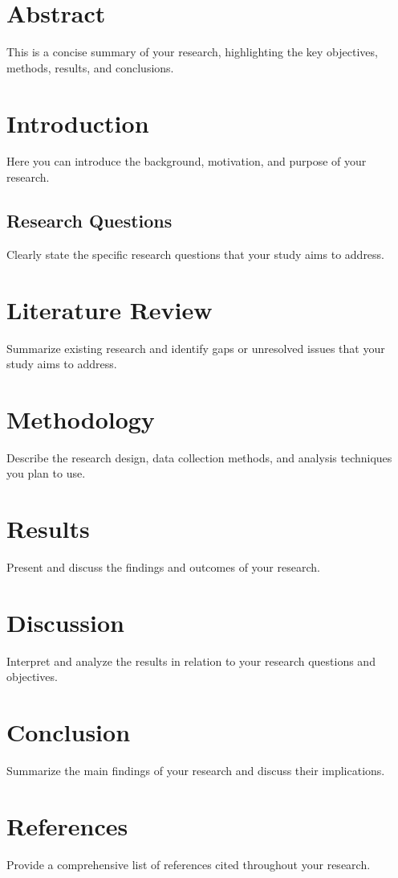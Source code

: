 \documentclass{article}
\begin{document}


\newpage
\tableofcontents
\newpage

\section*{Abstract}
This is a concise summary of your research, highlighting the key objectives, methods, results, and conclusions. 

\section{Introduction}
Here you can introduce the background, motivation, and purpose of your research.

\subsection{Research Questions}
Clearly state the specific research questions that your study aims to address.

\section{Literature Review}
Summarize existing research and identify gaps or unresolved issues that your study aims to address.

\section{Methodology}
Describe the research design, data collection methods, and analysis techniques you plan to use.

\section{Results}
Present and discuss the findings and outcomes of your research.

\section{Discussion}
Interpret and analyze the results in relation to your research questions and objectives.

\section{Conclusion}
Summarize the main findings of your research and discuss their implications.

\section{References}
Provide a comprehensive list of references cited throughout your research.
\end{document}
